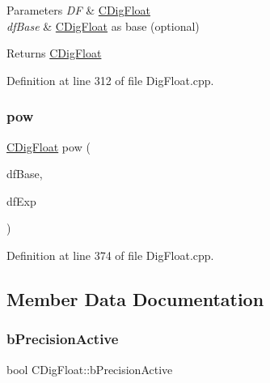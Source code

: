 \begin{DoxyParams}{Parameters}
{\em DF} & \hyperlink{classCDigFloat}{C\+Dig\+Float} \\
\hline
{\em df\+Base} & \hyperlink{classCDigFloat}{C\+Dig\+Float} as base (optional) \\
\hline
\end{DoxyParams}
\begin{DoxyReturn}{Returns}
\hyperlink{classCDigFloat}{C\+Dig\+Float} 
\end{DoxyReturn}


Definition at line 312 of file Dig\+Float.\+cpp.

\mbox{\label{classCDigFloat_ac5877d13039d236858e1cb04351f0a86}} 
\subsubsection{\texorpdfstring{pow}{pow}}
{\footnotesize\ttfamily \hyperlink{classCDigFloat}{C\+Dig\+Float} pow (\begin{DoxyParamCaption}\item[{const \hyperlink{classCDigFloat}{C\+Dig\+Float} \&}]{df\+Base,  }\item[{const \hyperlink{classCDigFloat}{C\+Dig\+Float} \&}]{df\+Exp }\end{DoxyParamCaption})\hspace{0.3cm}{\ttfamily [friend]}}



Definition at line 374 of file Dig\+Float.\+cpp.



\subsection{Member Data Documentation}
\mbox{\label{classCDigFloat_aa1f6ed0312a2aa6ae5ee2abd195adefc}} 
\subsubsection{\texorpdfstring{b\+Precision\+Active}{bPrecisionActive}}
{\footnotesize\ttfamily bool C\+Dig\+Float\+::b\+Precision\+Active\hspace{0.3cm}{\ttfamily [protected]}}



